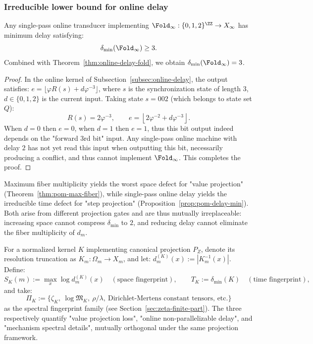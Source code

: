 \subsubsection{Irreducible lower bound for online delay}\label{subsec:pom-delay-lb}
\begin{proposition}\label{prop:pom-delay-min}
Any single-pass online transducer implementing $\Fold_\infty:\{0,1,2\}^{\ZZ}\to X_\infty$ has minimum delay satisfying:
\[
\delta_{\min}(\Fold_\infty)\ge 3.
\]
Combined with Theorem~\ref{thm:online-delay-fold}, we obtain $\delta_{\min}(\Fold_\infty)=3$.
\end{proposition}
\begin{proof}
In the online kernel of Subsection~\ref{subsec:online-delay}, the output satisfies:
\(
e=\lfloor \varphi R(s)+d\varphi^{-3}\rfloor
\),
where $s$ is the synchronization state of length $3$, $d\in\{0,1,2\}$ is the current input. Taking state $s=002$ (which belongs to state set $Q$):
\[
R(s)=2\varphi^{-3},\qquad
e=\left\lfloor 2\varphi^{-2}+d\varphi^{-3}\right\rfloor.
\]
When $d=0$ then $e=0$, when $d=1$ then $e=1$, thus this bit output indeed depends on the "forward 3rd bit" input. Any single-pass online machine with delay $2$ has not yet read this input when outputting this bit, necessarily producing a conflict, and thus cannot implement $\Fold_\infty$. This completes the proof.
\end{proof}

\begin{remark}\label{rem:pom-space-time-orth}
Maximum fiber multiplicity yields the worst space defect for "value projection" (Theorem~\ref{thm:pom-max-fiber}), while single-pass online delay yields the irreducible time defect for "step projection" (Proposition~\ref{prop:pom-delay-min}). Both arise from different projection gates and are thus mutually irreplaceable: increasing space cannot compress $\delta_{\min}$ to $2$, and reducing delay cannot eliminate the fiber multiplicity of $d_m$.
\end{remark}

\begin{definition}\label{def:pom-fingerprint}
For a normalized kernel $K$ implementing canonical projection $P_Z$, denote its resolution truncation as $K_m:\Omega_m\to X_m$, and let:
\(
d^{(K)}_m(x):=|K_m^{-1}(x)|
\).
Define:
\[
S_K(m):=\max_{x}\log d^{(K)}_m(x)\quad(\text{space fingerprint}),
\qquad
T_K:=\delta_{\min}(K)\quad(\text{time fingerprint}),
\]
and take:
\[
\Pi_K:=\{\zeta_K,\ \log\mathfrak{M}_K,\ \rho/\lambda,\ \text{Dirichlet-Mertens constant tensors, etc.}\}
\]
as the spectral fingerprint family (see Section~\ref{sec:zeta-finite-part}). The three respectively quantify "value projection loss", "online non-parallelizable delay", and "mechanism spectral details", mutually orthogonal under the same projection framework.
\end{definition}

